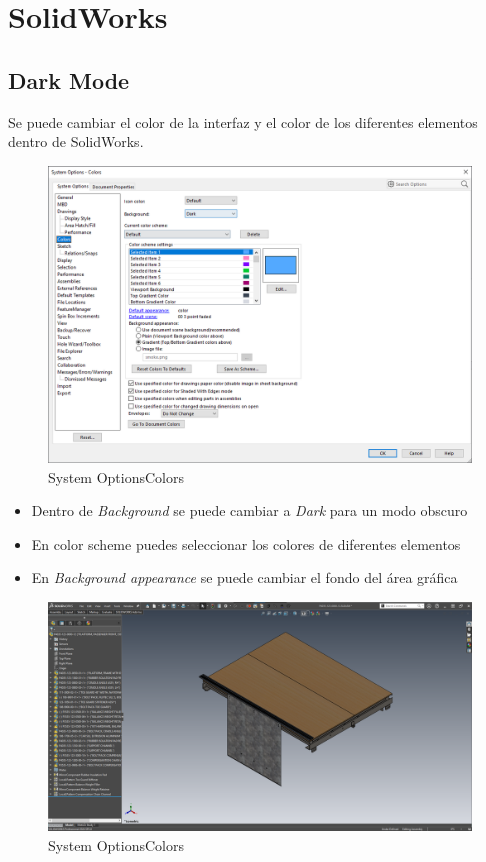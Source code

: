 \documentclass{report}
\begin{document}
\part{SolidWorks}

\chapter{Dark Mode}

Se puede cambiar el color de la interfaz y el color de los diferentes elementos dentro de SolidWorks.

\begin{figure}[H]
	\centering
	\includegraphics[width=0.95\linewidth, height=0.65\textheight,keepaspectratio]{Imagenes/solidworks_dark_mode01}
	\caption{System Options\textrightarrow Colors}
	\label{fig:solidworksdarkmode01}
\end{figure}

\begin{itemize}
	\item Dentro de \emph{Background} se puede cambiar a \emph{Dark} para un modo obscuro
	\item En color scheme puedes seleccionar los colores de diferentes elementos
	\item En \emph{Background appearance} se puede cambiar el fondo del área gráfica
\end{itemize}

\begin{figure}[H]
	\centering
	\includegraphics[width=0.95\linewidth, height=0.75\textheight,keepaspectratio]{Imagenes/solidworks_dark_mode02}
	\caption{System Options\textrightarrow Colors}
	\label{fig:solidworksdarkmode02}
\end{figure}
\end{document}
